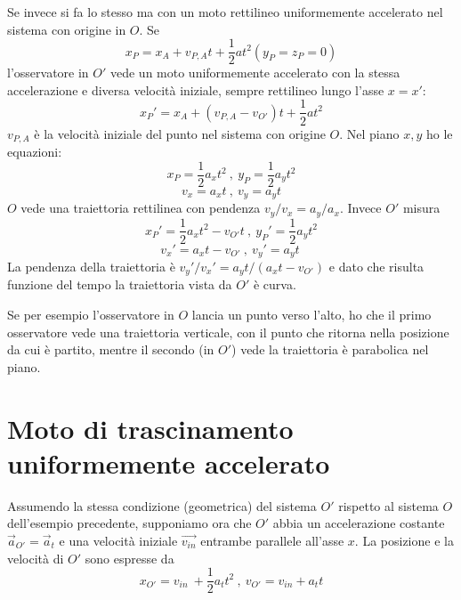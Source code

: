 \documentclass[class=book, crop=false, oneside, 12pt]{standalone}
\begin{document}
Se invece si fa lo stesso ma con un moto rettilineo uniformemente accelerato nel sistema con origine in \(O\). \newline
Se
\begin{equation*}
    x_P = x_A + v_{P,A} t + \frac{1}{2} a t^2  (y_P = z_P = 0 )
\end{equation*}
l'osservatore in \(O'\) vede un moto uniformemente accelerato con la stessa accelerazione e diversa velocità iniziale, sempre rettilineo lungo l'asse \(x = x'\): 
\begin{equation*}
    x_P' = x_A + (v_{P,A}-v_{O'}) t + \frac{1}{2} a t^2
\end{equation*}
\(v_{P,A}\) è la velocità iniziale del punto nel sistema con origine \(O\).
Nel piano \(x,y\) ho le equazioni:
\begin{equation*}
    x_P = \frac{1}{2} a_x t^2 \ , \ y_P = \frac{1}{2} a_y t^2
\end{equation*}
\begin{equation*}
    v_x = a_x t \ , \ v_y = a_y t
\end{equation*}
\(O\) vede una traiettoria rettilinea con pendenza \(v_y / v_x = a_y / a_x\). 
Invece \(O'\) misura
\begin{equation*}
    x_P' = \frac{1}{2} a_x t^2 - v_{O'} t \ , \ y_P ' = \frac{1}{2} a_y t^2
\end{equation*}
\begin{equation*}
    v_x ' = a_x t - v_{O'} \ , \ v_y ' = a_y t  \ 
\end{equation*}
La pendenza della traiettoria è \(v_y' / v_x' = a_y t / (a_x t - v_{O'})\) e dato che risulta funzione del tempo la traiettoria vista da \(O'\) è curva.

Se per esempio l'osservatore in \(O\) lancia un punto verso l'alto, ho che il primo osservatore vede una traiettoria verticale, con il punto che ritorna nella posizione da cui è partito, mentre il secondo (in \(O'\)) vede la traiettoria è parabolica nel piano.

\section{Moto di trascinamento uniformemente accelerato}

Assumendo la stessa condizione (geometrica) del sistema \(O'\) rispetto al sistema \(O\) dell'esempio precedente, 
supponiamo ora che \(O'\) abbia un accelerazione costante \(\overrightarrow{a}_{O'} = \overrightarrow{a}_t\) e una velocità iniziale \(\overrightarrow{v_{in}}\) entrambe parallele all'asse \(x\).\newline
La posizione e la velocità di \(O'\) sono espresse da
\begin{equation*}
    x_{O'} =v_{in} \ + \frac{1}{2} a_t t^2 \ , \ v_{O'} = v_{in} + a_t t
\end{equation*}
\end{document}
